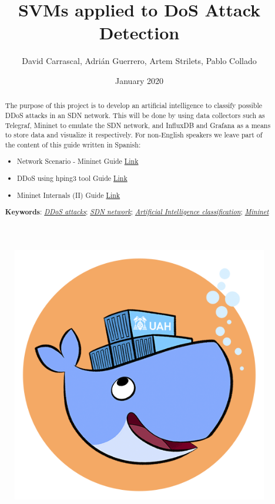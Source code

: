 \documentclass[12pt]{article}
\title{SVMs applied to DoS Attack Detection}
\author{David Carrascal, Adrián Guerrero, Artem Strilets, Pablo Collado}
\date{January 2020}
\newcommand{\newpar} {
    \vskip 1cm
}
\begin{document}
\begin{titlepage}
	\maketitle
	\newpar
	\newpar
		\begin{figure}[!htb]
		\centering
		\includegraphics[width=0.5\linewidth]{logo_project.png}
	\end{figure}
\end{titlepage}

\begin{abstract}
	The purpose of this project is to develop an artificial intelligence to classify possible DDoS attacks in an SDN network. This will be done by using data collectors such as Telegraf, Mininet to emulate the SDN network, and InfluxDB and Grafana as a means to store data and visualize it respectively. For non-English speakers we leave part of the content of this guide written in Spanish:

	\begin{itemize}
		\item Network Scenario - Mininet Guide \href{https://hackmd.io/@davidcawork/r1fZC-nRS}{Link}
		\item DDoS using hping3 tool Guide \href{https://hackmd.io/@davidcawork/HJ_D7jA0r}{Link}
		\item Mininet Internals (II) Guide \href{https://hackmd.io/@davidcawork/SyrwHoNJL}{Link}
	\end{itemize}

	\textbf{Keywords}: \href{https://www.digitalattackmap.com/}{\textit{DDoS attacks}}; \href{https://www.opennetworking.org/sdn-definition}{\textit{SDN network}}; \href{https://www.sciencedirect.com/science/article/abs/pii/016974399500050X}{\textit{Artificial Intelligence classification}}; \href{https://mininet.org}{\textit{Mininet}}
\end{abstract}
\end{document}
